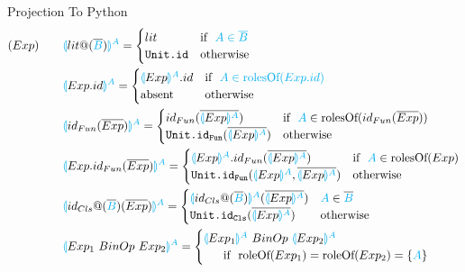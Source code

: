\documentclass[11pt]{jarticle}
\newcommand{\projection}[2]{{\color{cyan}\llparenthesis}#1{\color{cyan}\rrparenthesis^#2}}
\begin{document}
Projection To Python
\begin{alignat*}{2}
  &(Exp)~~~ &&\projection{lit@(\overline{\color{cyan}{B}})}{A}=
  \begin{cases}
    lit & \text{if}~~ \color{cyan}{A}\in \overline{\color{cyan}{B}}\\
    \texttt{Unit.id} &\text{otherwise}
  \end{cases}\\
  &&&\projection{Exp.id}{A}= 
  \begin{cases}
    \projection{Exp}{A}.id &\text{if}~~\color{cyan}{A} \in \text{rolesOf} (Exp.id)\\
    \text{absent} &\text{otherwise}
  \end{cases}\\
  &&&\projection{id_{Fun}(\overline{Exp})}{A}=
  \begin{cases}
    id_{Fun}(\overline{\projection{Exp}{A}}) &\color{black}\text{if}~~ \color{cyan}A \color{black} \in \text{rolesOf} (id_{Fun}(\overline{Exp}))\\
    \texttt{Unit.id}_\texttt{Fun}(\overline{\projection{Exp}{A}}) &\color{black} \text{otherwise}
  \end{cases}\\
  &&&\projection{Exp.id_{Fun}(\overline{Exp})}{A}=
  \begin{cases}
    \projection{Exp}{A}.id_{Fun}(\overline{\projection{Exp}{A}}) &\text{if}~~ \color{cyan}A \color{black} \in \text{rolesOf}(Exp)\\
    \texttt{Unit.id}_\texttt{Fun}(\projection{Exp}{A}\color{black},\overline{\projection{Exp}{A}}) &\color{black} \text{otherwise}
  \end{cases}\\
  &&&\projection{id_{Cls}@(\overline{\color{cyan}B}\color{black})(\overline{Exp})}{A}=
  \begin{cases}
    \projection{id_{Cls}@(\overline{\color{cyan}B})}{A}(\overline{\projection{Exp}{A}}\color{black}) & \color{cyan}A \color{black} \in \overline{\color{cyan}B}\\
    \texttt{Unit.id}_\texttt{Cls}(\overline{\projection{Exp}{A}}) &\text{otherwise}
  \end{cases}\\
  &&&\projection{Exp_1~BinOp~Exp_2}{A}=
  \begin{cases}
    \projection{Exp_1}{A} ~BinOp~ \projection{Exp_2}{A} \\
    ~~~~~\color{black} \text{if}~~\text{roleOf}(Exp_1) = \text{roleOf}(Exp_2) = \{\color{cyan}A\color{black}\}\\

\end{cases}
\end{alignat*}
\end{document}
